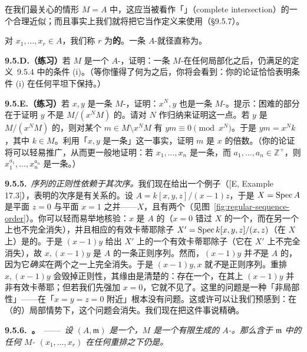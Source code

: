 在我们最关心的情形 $M=A$ 中，这应当被看作「\trCompleteIntersection」（complete intersection）的一个合理近似；而且事实上我们就将把它当作定义来使用（\S9.5.7）。

对\trRegularSequence{} $x_1,\dots,x_r\in A$，我们称 $r$ 为\textbf{\trRegularSequence{}的\trLength}。一条 $A$-\trRegularSequence{}就径直称为\textbf{\trRegularSequence}。

\textbf{9.5.D.（练习）}\quad 若 $M$ 是一个 $A$-\trModule，证明：一条 $M$-\trRegularSequence{}在任何局部化之后，仍满足\trRegularSequence{}的定义~9.5.4 中的条件 (i)。（等你懂得了何为\trFlatness{}之后，你将会看到：你的论证恰恰表明条件 (i) 在任何平坦\trBaseChange{}下保持。）

\textbf{9.5.E.（练习）}\quad 若 $x,y$ 是一条 $M$-\trRegularSequence，证明：$x^N,y$ 也是一条 $M$-\trRegularSequence。提示：困难的部分在于证明 $y$ 不是 $M/(x^N M)$ 的\trZerodivisor。请对 $N$ 作归纳来证明这一点。若 $y$ 是 $M/(x^N M)$ 的\trZerodivisor，则对某个 $m\in M\setminus x^N M$ 有 $ym\equiv 0\pmod{x^N}$。于是 $ym=x^N k$，其中 $k\in M$。利用「$x,y$ 是一条\trRegularSequence」这一事实，证明 $m$ 是 $x$ 的倍数。（你的论证将可以轻易推广，从而更一般地证明：若 $x_1,\dots,x_n$ 是一条\trRegularSequence，而 $a_1,\dots,a_n\in\mathbb{Z}^+$，则 $x_1^{a_1},\dots,x_n^{a_n}$ 是一条\trRegularSequence。）

\textbf{9.5.5.}\ \emph{序列的正则性依赖于其次序。}\quad 我们现在给出一个例子（[E, Example 17.3]），表明\trRegularSequence{}的次序是有关系的。设 $A=k[x,y,z]/(x-1)z$，于是 $X=\operatorname{Spec} A$ 是平面 $z=0$ 与平面 $x=1$ 之并——$X$\trReduced，且有两个\trIrreducibleComponent（见图~\ref{fig:regular-sequence-order}）。你可以轻而易举地核验：$x$ 是 $A$ 的\trNonZerodivisor（$x=0$ 错过 $X$ 的一个\trIrreducibleComponent，而在另一个上也不完全消失），并且相应的有效卡蒂耶除子 $X'=\operatorname{Spec} k[x,y,z]/(x,z)$（在 $X$ 上）是\trIntegral{}的。于是 $(x-1)y$ 给出 $X'$ 上的一个有效卡蒂耶除子（它在 $X'$ 上不完全消失），故 $x,(x-1)y$ 是 $A$ 的一条正则序列。然而，$(x-1)y$ 并\emph{不}是 $A$ 的\trNonZerodivisor，因为它\emph{确实}在两个\trIrreducibleComponent{}之一上完全消失。于是 $(x-1)y,x$ 就\emph{不}是正则序列。重排\trRegularSequence{} $x,(x-1)y$ 会毁掉正则性，其缘由是清楚的：存在一个\trLocus，在其上 $(x-1)y$ 并非有效卡蒂耶；但若我们先强加 $x=0$，它就不见了。这里的问题是一种「非局部性」——在「$x=y=z=0$ 附近」根本没有问题。这或许可以让我们预感到：在（\trNoetherian{}的）局部情势下，这个问题会消失。我们现在把这件事说精确。

\textbf{9.5.6.\ \trhTheorem{}。}\ ——\ \emph{设 $(A,\mathfrak{m})$ 是一个\trNoetherian{}\trLocalRing，$M$ 是一个有限生成的 $A$-\trModule。那么含于 $\mathfrak{m}$ 中的任何 $M$-\trRegularSequence{} $(x_1,\dots,x_r)$ 在任何重排之下仍是\trRegularSequence。}

